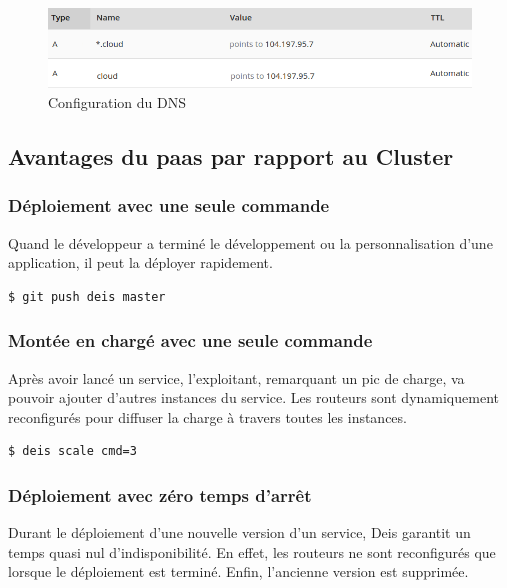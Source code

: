 \begin{onehalfspace}
\begin{figure}[H]
\centering
\includegraphics [scale=0.55]{chapitre5/assets/dns}
\caption{Configuration du DNS}
\label{fig:dns}
\end{figure}


\subsection{Avantages du \acrshort{paas} par rapport au Cluster}

\subsubsection*{Déploiement avec une seule commande}

	Quand le développeur a terminé le développement ou la personnalisation d'une application, il peut la déployer rapidement.

	\begin{lstlisting}[language=bash,caption=Déploiement avec Deis]
		$ git push deis master
	\end{lstlisting}

\subsubsection*{Montée en chargé avec une seule commande}

Après avoir lancé un service, l'exploitant, remarquant un pic de charge, va pouvoir ajouter d'autres instances du service. Les routeurs sont dynamiquement reconfigurés pour diffuser la charge à travers toutes les instances.

	\begin{lstlisting}[language=bash,caption=Montée en charge]
		$ deis scale cmd=3
	\end{lstlisting}

\subsubsection*{Déploiement avec zéro temps d'arrêt}

Durant le déploiement d'une nouvelle version d'un service, Deis garantit un temps quasi nul d'indisponibilité. En effet, les routeurs ne sont reconfigurés que lorsque le déploiement est terminé. Enfin, l'ancienne version est supprimée.



\end{onehalfspace}
